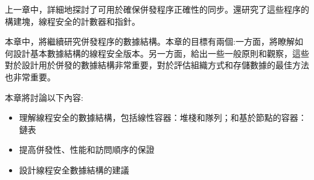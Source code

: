 上一章中，詳細地探討了可用於確保併發程序正確性的同步。還研究了這些程序的構建塊，線程安全的計數器和指針。

本章中，將繼續研究併發程序的數據結構。本章的目標有兩個:一方面，將瞭解如何設計基本數據結構的線程安全版本。另一方面，給出一些一般原則和觀察，這些對於設計用於併發的數據結構非常重要，對於評估組織方式和存儲數據的最佳方法也非常重要。

本章將討論以下內容:

\begin{itemize}
\item
理解線程安全的數據結構，包括線性容器：堆棧和隊列；和基於節點的容器：鏈表

\item
提高併發性、性能和訪問順序的保證

\item
設計線程安全數據結構的建議

\end{itemize}















